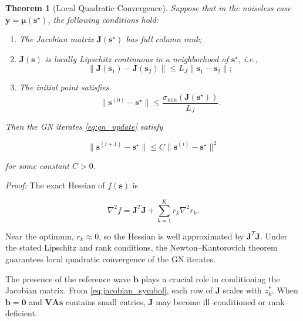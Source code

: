 \documentclass[journal]{IEEEtran}
\newtheorem{theorem}{Theorem}
\begin{document}
\begin{theorem}[Local Quadratic Convergence]
Suppose that in the noiseless case $\mathbf y=\boldsymbol{\mu}(\mathbf s^\star)$, the following conditions hold:

\begin{enumerate}
\item The Jacobian matrix $\mathbf J(\mathbf s^\star)$ has full column rank;
\item $\mathbf J(\mathbf s)$ is locally Lipschitz continuous in a neighborhood of $\mathbf s^\star$, i.e.,
\begin{equation}
\| \mathbf J(\mathbf s_1)-\mathbf J(\mathbf s_2)
\| \le L_J \| \mathbf s_1-\mathbf s_2 \|;
\end{equation}
\item The initial point satisfies
\begin{equation}
\| \mathbf s^{(0)}-\mathbf s^\star \| \le \frac{\sigma_{\min}(\mathbf J(\mathbf s^\star))}{L_J}.
\end{equation}
\end{enumerate}

Then the GN iterates \eqref{eq:gn_update} satisfy

\begin{equation}
\| \mathbf s^{(i+1)}-\mathbf s^\star \| \le C \| \mathbf s^{(i)}-\mathbf s^\star \|^2
\end{equation}

for some constant $C>0$.
\end{theorem}


\emph{Proof:}
The exact Hessian of $f(\mathbf s)$ is

\begin{equation}
\nabla^2 f = \mathbf J^T\mathbf J + \sum_{k=1}^{K} r_k \nabla^2 r_k .
\end{equation}

Near the optimum, $r_k\approx0$, so the Hessian is well approximated by $\mathbf J^T\mathbf J$. Under the stated Lipschitz and rank conditions, the Newton--Kantorovich theorem guarantees local quadratic convergence of the GN iterates.



The presence of the reference wave $\mathbf b$ plays a crucial role in conditioning the Jacobian matrix. From \eqref{eq:jacobian_symbol}, each row of $\mathbf J$ scales with $z_k^*$. When $\mathbf b=\mathbf 0$ and $\mathbf V\mathbf A\mathbf s$ contains small entries, $\mathbf J$ may become ill--conditioned or rank--deficient.
\end{document}
